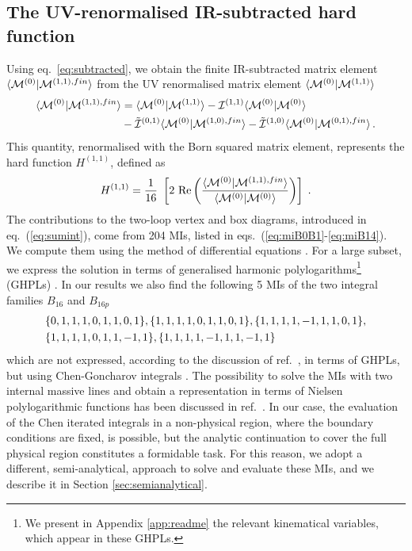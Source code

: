 \documentclass[11pt,a4paper]{article}
\begin{document}
\subsection{The UV-renormalised IR-subtracted hard function}
Using eq.~\eqref{eq:subtracted},
we obtain the finite IR-subtracted matrix element $\langle {\cal M}^{(0)} | {\cal M}^{(1,1),fin} \rangle$
from the UV renormalised matrix element $\langle {\cal M}^{(0)} | {\cal M}^{(1,1)} \rangle$
%
\begin{align}
\langle {\cal M}^{(0)} | {\cal M}^{(1,1),fin} \rangle &= \langle {\cal M}^{(0)} | {\cal M}^{(1,1)} \rangle -  {\cal I}^{(1,1)} \langle {\cal M}^{(0)}  | {\cal M}^{(0)} \rangle
\nonumber\\&
                                                 - \tilde{{\cal I}}^{(0,1)} \langle {\cal M}^{(0)} | {\cal M}^{(1,0),fin} \rangle
                                                 - \tilde{{\cal I}}^{(1,0)} \langle {\cal M}^{(0)} | {\cal M}^{(0,1),fin} \rangle \,.
\end{align}
  This quantity, renormalised with the Born squared matrix element, represents the hard function $H^{(1,1)}$,
  defined as
\begin{equation}
% 
 H^{(1,1)} =
 \frac{1}{16}~
\left[
  2 ~ {\rm Re} \left( \frac{\langle \M^{(0)} | \M^{(1,1),fin} \rangle}{\langle \M^{(0)} | \M^{(0)} \rangle} \right)
\right]
  \;.
\end{equation}
%
The contributions to the two-loop vertex and box diagrams,
introduced in eq.~(\ref{eq:sumint}),
come from 204 MIs, listed in eqs.~(\ref{eq:miB0B1}-\ref{eq:miB14}).
We compute them
using the method of differential equations \cite{Kotikov:1990kg,Remiddi:1997ny,Gehrmann:1999as,Argeri:2007up,Henn:2014qga,Ablinger:2015tua,Ablinger:2018zwz}.
For a large subset, we express the solution
in terms of generalised harmonic polylogarithms\footnote{
We present in Appendix \ref{app:readme} the relevant kinematical variables, which appear in these GHPLs.}
(GHPLs) \cite{Goncharov:polylog,Goncharov:2001iea,Remiddi:1999ew}.
In our results we also find
the following 5 MIs
of the two integral families $B_{16}$ and $B_{16p}$
\begin{align}
& \{0, 1, 1, 1, 0, 1, 1, 0, 1\}, \{1, 1, 1, 1, 0, 1, 1, 0, 1\}, \{1, 1, 1, 1, -1, 1, 1, 0, 1\},  \nonumber \\&
  \{1, 1, 1, 1, 0, 1, 1, -1, 1\}, \{1, 1, 1, 1, -1, 1, 1, -1, 1\}
\label{eq:boxmis}
\end{align}
%
which are not expressed,
according to the discussion of ref.~\cite{Bonciani:2016ypc},
in terms of GHPLs,
%
but using Chen-Goncharov integrals \cite{Chen:1977oja}.
The possibility to solve the MIs with two internal massive lines
and obtain a representation in terms of Nielsen polylogarithmic functions
has been discussed in ref.~\cite{Heller:2019gkq}.
%
In our case, the evaluation of the Chen iterated integrals \cite{Chen:1977oja}
in a non-physical region, where the boundary conditions are fixed, is possible,
but the analytic continuation to cover the full physical region
constitutes a formidable task.
For this reason, we adopt a different, semi-analytical, approach
to solve and evaluate these MIs,
and we describe it in Section \ref{sec:semianalytical}.
\end{document}
